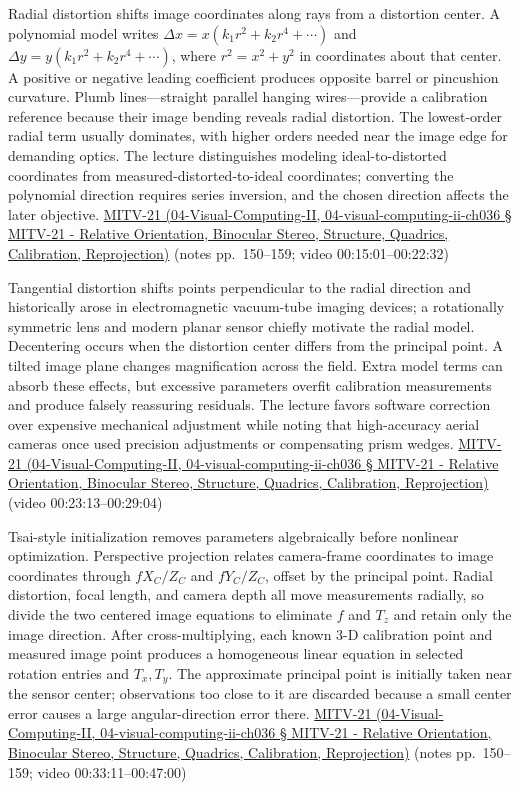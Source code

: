 Radial distortion shifts image coordinates along rays from a distortion center. A polynomial model writes \(\Delta x=x(k_1r^2+k_2r^4+\cdots)\) and \(\Delta y=y(k_1r^2+k_2r^4+\cdots)\), where \(r^2=x^2+y^2\) in coordinates about that center. A positive or negative leading coefficient produces opposite barrel or pincushion curvature. Plumb lines---straight parallel hanging wires---provide a calibration reference because their image bending reveals radial distortion. The lowest-order radial term usually dominates, with higher orders needed near the image edge for demanding optics. The lecture distinguishes modeling ideal-to-distorted coordinates from measured-distorted-to-ideal coordinates; converting the polynomial direction requires series inversion, and the chosen direction affects the later objective. \href{}{MITV-21 (04-Visual-Computing-II, 04-visual-computing-ii-ch036 § MITV-21 - Relative Orientation, Binocular Stereo, Structure, Quadrics, Calibration, Reprojection)} (notes pp.~150--159; video 00:15:01--00:22:32)

Tangential distortion shifts points perpendicular to the radial direction and historically arose in electromagnetic vacuum-tube imaging devices; a rotationally symmetric lens and modern planar sensor chiefly motivate the radial model. Decentering occurs when the distortion center differs from the principal point. A tilted image plane changes magnification across the field. Extra model terms can absorb these effects, but excessive parameters overfit calibration measurements and produce falsely reassuring residuals. The lecture favors software correction over expensive mechanical adjustment while noting that high-accuracy aerial cameras once used precision adjustments or compensating prism wedges. \href{}{MITV-21 (04-Visual-Computing-II, 04-visual-computing-ii-ch036 § MITV-21 - Relative Orientation, Binocular Stereo, Structure, Quadrics, Calibration, Reprojection)} (video 00:23:13--00:29:04)

Tsai-style initialization removes parameters algebraically before nonlinear optimization. Perspective projection relates camera-frame coordinates to image coordinates through \(fX_C/Z_C\) and \(fY_C/Z_C\), offset by the principal point. Radial distortion, focal length, and camera depth all move measurements radially, so divide the two centered image equations to eliminate \(f\) and \(T_z\) and retain only the image direction. After cross-multiplying, each known 3-D calibration point and measured image point produces a homogeneous linear equation in selected rotation entries and \(T_x,T_y\). The approximate principal point is initially taken near the sensor center; observations too close to it are discarded because a small center error causes a large angular-direction error there. \href{}{MITV-21 (04-Visual-Computing-II, 04-visual-computing-ii-ch036 § MITV-21 - Relative Orientation, Binocular Stereo, Structure, Quadrics, Calibration, Reprojection)} (notes pp.~150--159; video 00:33:11--00:47:00)


